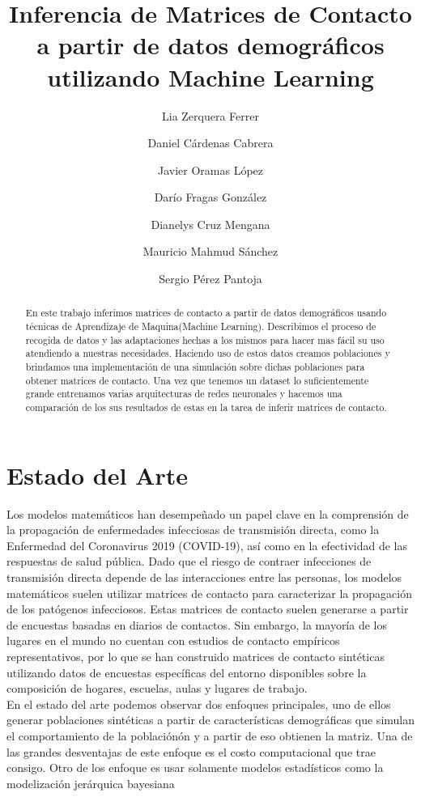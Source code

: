\documentclass{article}
\title{Inferencia de Matrices de Contacto a partir de datos demográficos utilizando Machine Learning}
\author[1]{Lia Zerquera Ferrer}
\author[1]{Daniel C\'ardenas Cabrera}
\author[1]{Javier Oramas L\'opez}
\author[1]{Darío Fragas González}
\author[1]{Dianelys Cruz Mengana}
\author[1]{Mauricio Mahmud Sánchez}
\author[1]{Sergio Pérez Pantoja}
\affil[1]{Facultad de Matem\'atica y Computaci\'on de la Universidad de La Habana}
\date{}
\begin{document}
\maketitle

\begin{abstract}
    En este trabajo inferimos matrices de contacto a partir de datos demográficos usando técnicas de Aprendizaje de Maquina(Machine Learning). Describimos el proceso de recogida de datos y las adaptaciones hechas a los mismos para hacer mas fácil su uso atendiendo a nuestras necesidades. Haciendo uso de estos datos creamos poblaciones y brindamos una implementación de una simulación sobre dichas poblaciones para obtener matrices de contacto. Una vez que tenemos un dataset lo suficientemente grande entrenamos varias arquitecturas de redes neuronales y hacemos una comparación de los sus resultados de estas en la tarea de inferir matrices de contacto.
\end{abstract}

\section{Estado del Arte}

Los modelos matemáticos han desempeñado un papel clave en la comprensión de la propagación de enfermedades infecciosas de transmisión directa, como la Enfermedad del Coronavirus 2019 (COVID-19), así como en la efectividad de las respuestas de salud pública. Dado que el riesgo de contraer infecciones de transmisión directa depende de las interacciones entre las personas, los modelos matemáticos suelen utilizar matrices de contacto para caracterizar la propagación de los patógenos infecciosos. Estas matrices de contacto suelen generarse a partir de encuestas basadas en diarios de contactos. Sin embargo, la mayoría de los lugares en el mundo no cuentan con estudios de contacto empíricos representativos, por lo que se han construido matrices de contacto sintéticas utilizando datos de encuestas específicas del entorno disponibles sobre la composición de hogares, escuelas, aulas y lugares de trabajo.\\
En el estado del arte podemos observar dos enfoques principales, uno de ellos generar poblaciones sintéticas a partir de características demográficas que simulan el comportamiento de la población\'on y a partir de eso obtienen la matriz\cite{socialcontacts}. Una de las grandes desventajas de este enfoque es el costo computacional que trae consigo. Otro de los enfoque es usar solamente modelos estadísticos como la modelización jerárquica bayesiana\cite{projectic-contacts}
\end{document}
